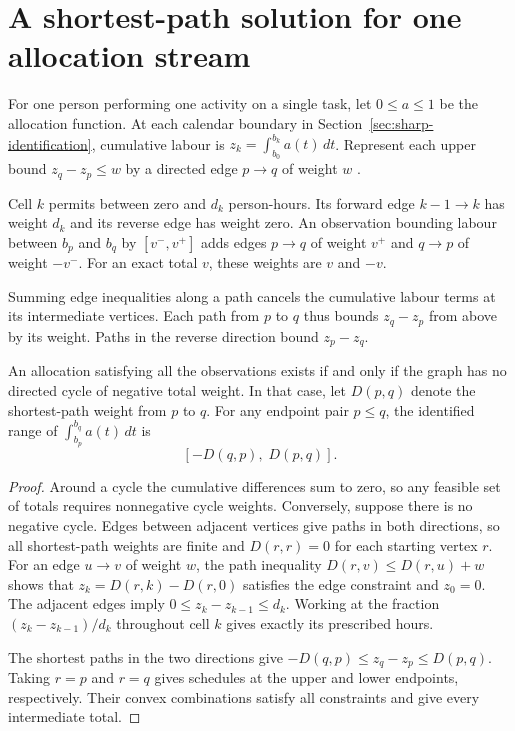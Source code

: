 \section{A shortest-path solution for one allocation stream}
\label{app:scalar}

For one person performing one activity on a single task, let $0\leq a\leq1$ be the allocation function. At each calendar boundary in Section~\ref{sec:sharp-identification}, cumulative labour is $z_k=\int_{b_0}^{b_k}a(t)\,dt$. Represent each upper bound $z_q-z_p\leq w$ by a directed edge $p\to q$ of weight $w$ \cite[Slides~6--11]{indyk2011}.

Cell $k$ permits between zero and $d_k$ person-hours. Its forward edge $k-1\to k$ has weight $d_k$ and its reverse edge has weight zero. An observation bounding labour between $b_p$ and $b_q$ by $[v^-,v^+]$ adds edges $p\to q$ of weight $v^+$ and $q\to p$ of weight $-v^-$. For an exact total $v$, these weights are $v$ and $-v$.

Summing edge inequalities along a path cancels the cumulative labour terms at its intermediate vertices. Each path from $p$ to $q$ thus bounds $z_q-z_p$ from above by its weight. Paths in the reverse direction bound $z_p-z_q$.

\begin{proposition}
\label{prop:graph-bounds}
An allocation satisfying all the observations exists if and only if the graph has no directed cycle of negative total weight. In that case, let $D(p,q)$ denote the shortest-path weight from $p$ to $q$. For any endpoint pair $p\leq q$, the identified range of $\int_{b_p}^{b_q}a(t)\,dt$ is
\begin{equation}
\label{eq:graph-range}
 [-D(q,p),\;D(p,q)].
\end{equation}
\end{proposition}
\begin{proof}
Around a cycle the cumulative differences sum to zero, so any feasible set of totals requires nonnegative cycle weights. Conversely, suppose there is no negative cycle. Edges between adjacent vertices give paths in both directions, so all shortest-path weights are finite and $D(r,r)=0$ for each starting vertex $r$. For an edge $u\to v$ of weight $w$, the path inequality $D(r,v)\leq D(r,u)+w$ shows that $z_k=D(r,k)-D(r,0)$ satisfies the edge constraint and $z_0=0$. The adjacent edges imply $0\leq z_k-z_{k-1}\leq d_k$. Working at the fraction $(z_k-z_{k-1})/d_k$ throughout cell $k$ gives exactly its prescribed hours.

The shortest paths in the two directions give $-D(q,p)\leq z_q-z_p\leq D(p,q)$. Taking $r=p$ and $r=q$ gives schedules at the upper and lower endpoints, respectively. Their convex combinations satisfy all constraints and give every intermediate total.
\end{proof}


